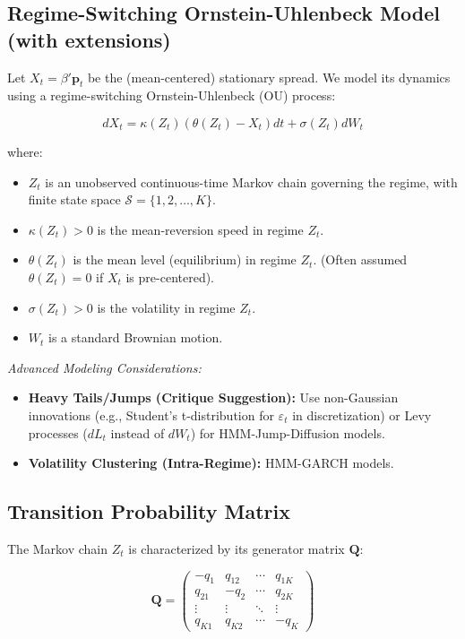 \documentclass{article}
\begin{document}
\subsection{Regime-Switching Ornstein-Uhlenbeck Model (with extensions)}

Let $X_t = \beta' \mathbf{p}_t$ be the (mean-centered) stationary spread. We model its dynamics using a regime-switching Ornstein-Uhlenbeck (OU) process:

\begin{equation}
dX_t = \kappa(Z_t)(\theta(Z_t) - X_t)dt + \sigma(Z_t)dW_t
\label{eq:hmm_sde}
\end{equation}

where:
\begin{itemize}
    \item $Z_t$ is an unobserved continuous-time Markov chain governing the regime, with finite state space $\mathcal{S} = \{1, 2, \ldots, K\}$.
    \item $\kappa(Z_t) > 0$ is the mean-reversion speed in regime $Z_t$.
    \item $\theta(Z_t)$ is the mean level (equilibrium) in regime $Z_t$. (Often assumed $\theta(Z_t) = 0$ if $X_t$ is pre-centered).
    \item $\sigma(Z_t) > 0$ is the volatility in regime $Z_t$.
    \item $W_t$ is a standard Brownian motion.
\end{itemize}

\textit{Advanced Modeling Considerations:}
\begin{itemize}
    \item \textbf{Heavy Tails/Jumps (Critique Suggestion):} Use non-Gaussian innovations (e.g., Student's t-distribution for $\varepsilon_t$ in discretization) or Levy processes ($dL_t$ instead of $dW_t$) for HMM-Jump-Diffusion models.
    \item \textbf{Volatility Clustering (Intra-Regime):} HMM-GARCH models.
\end{itemize}

\subsection{Transition Probability Matrix}

The Markov chain $Z_t$ is characterized by its generator matrix $\mathbf{Q}$:

\begin{equation}
\mathbf{Q} = 
\begin{pmatrix}
-q_{1} & q_{12} & \cdots & q_{1K} \\
q_{21} & -q_{2} & \cdots & q_{2K} \\
\vdots & \vdots & \ddots & \vdots \\
q_{K1} & q_{K2} & \cdots & -q_{K}
\end{pmatrix}
\end{equation}
\end{document}
